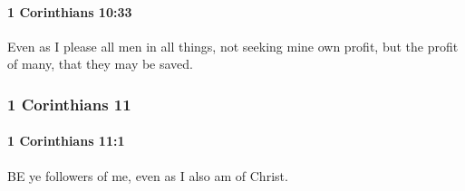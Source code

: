 		\paragraph{1 Corinthians 10:33} %
			\label{1CORINTHIANS-10-33}

			Even as I please all men in all things, not seeking mine own profit, but the profit of many, that they may be saved.

			\begin{framed}
				\scriptsize
				\begin{compactdesc}
					\item[SBLG] 
				\end{compactdesc}
			\end{framed}

	\subsubsection{1 Corinthians 11}
		\label{1CORINTHIANS-11}
		
		\paragraph{1 Corinthians 11:1} %
			\label{1CORINTHIANS-11-1}

			BE ye followers of me, even as I also am of Christ.

